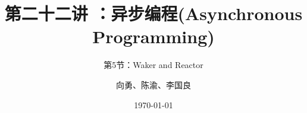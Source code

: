 


\title[第22讲]{第二十二讲 ：异步编程(Asynchronous Programming)}  %
\subtitle{第5节：Waker and Reactor}
\author{向勇、陈渝、李国良} %
\date{\today} %



\begin{frame}
\titlepage %
\end{frame}


